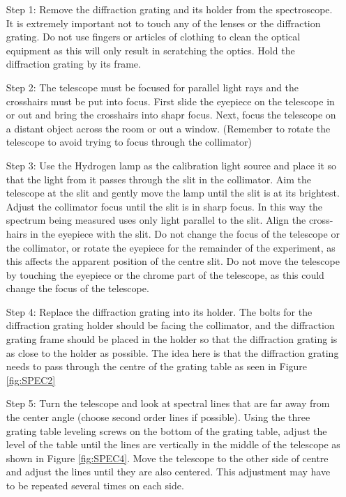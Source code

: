 \begin{itemize}[leftmargin = 50pt]
    \item[Step 1:] Remove the diffraction grating and its holder from the spectroscope. It is extremely important not to touch any of the lenses or the diffraction grating. Do not use fingers or articles of clothing to clean the optical equipment as this will only result in scratching the optics. Hold the diffraction grating by its frame.
    \item[Step 2:] The telescope must be focused for parallel light rays and the crosshairs must be put into focus. First slide the eyepiece on the telescope in or out and bring the crosshairs into shapr focus. Next, focus the telescope on a distant object across the room or out a window. (Remember to rotate the telescope to avoid trying to focus through the collimator)
    \item[Step 3:] Use the Hydrogen lamp as the calibration light source and place it so that the light from it passes through the slit in the collimator. Aim the telescope at the slit and gently move the lamp until the slit is at its brightest. Adjust the collimator focus until the slit is in sharp focus. In this way the spectrum being measured uses only light parallel to the slit. Align the cross-hairs in the eyepiece with the slit. Do not change the focus of the telescope or the collimator, or rotate the eyepiece for the remainder of the experiment, as this affects the apparent position of the centre slit. Do not move the telescope by touching the eyepiece or the chrome part of the telescope, as this could change the focus of the telescope.
    \item[Step 4:] Replace the diffraction grating into its holder. The bolts for the diffraction grating holder should be facing the collimator, and the diffraction grating frame should be placed in the holder so that the diffraction grating is as close to the holder as possible. The idea here is that the diffraction grating needs to pass through the centre of the grating table as seen in Figure \ref{fig:SPEC2}
    \item[Step 5:] Turn the telescope and look at spectral lines that are far away from the center angle (choose second order lines if possible). Using the three grating table leveling screws on the bottom of the grating table, adjust the level of the table until the lines are vertically in the middle of the telescope as shown in Figure \ref{fig:SPEC4}. Move the telescope to the other side of centre and adjust the lines until they are also centered. This adjustment may have to be repeated several times on each side.


\end{itemize}
